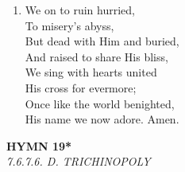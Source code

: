 \begin{enumerate}
    \item We on to ruin hurried, \\
        To misery's abyss, \\
        But dead with Him and buried, \\
        And raised to share His bliss, \\
        We sing with hearts united \\
        His cross for evermore; \\
        Once like the world benighted, \\
        His name we now adore. Amen.

\end{enumerate}

\newpage
\begin{center}
    {\Large \textbf{HYMN 19*}}
    \\
    \textit{7.6.7.6. D. TRICHINOPOLY}
\end{center}
\vspace{1em}


